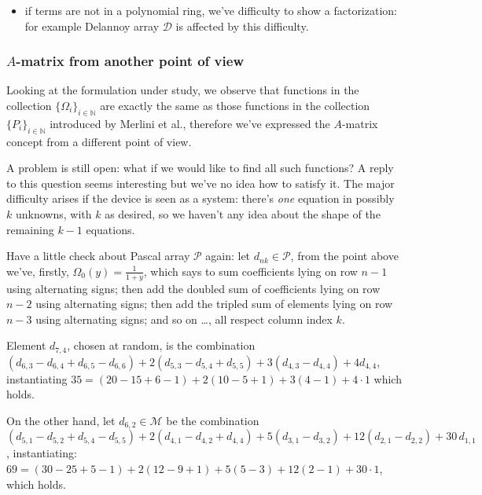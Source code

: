 \begin{itemize}
        \item if terms are not in a polynomial ring, we've difficulty to show a
        factorization: for example Delannoy array $\mathcal{D}$ is affected by this difficulty.

    \end{itemize}

\subsubsection{$A$-matrix from another point of view}

Looking at the formulation under study, we observe that functions
in the collection $\lbrace\Omega_{i}\rbrace_{i\in\mathbb{N}}$ 
are exactly the same as those functions in the collection 
$\lbrace P_{i}\rbrace_{i\in\mathbb{N}}$ 
introduced by Merlini et al., therefore we've expressed
the $A$-matrix concept from a different point of view. 

A problem is still open: what if we would like to find all such functions? A reply
to this question seems interesting but we've no idea how to satisfy it.
The major difficulty arises if the device is seen as a system:
there's \emph{one} equation in possibly $k$ unknowns, with $k$ as desired, 
so we haven't any idea about the shape of the remaining $k-1$ equations.

Have a little check about Pascal array $\mathcal{P}$ again:
let $d_{nk}\in\mathcal{P}$, from the point above we've, firstly,
$\Omega_{0}(y)=\frac{1}{1+y}$, which says to sum coefficients
lying on row $n-1$ using alternating signs; then add the doubled sum of
coefficients lying on row $n-2$ using alternating signs; 
then add the tripled sum of elements lying on row $n-3$ 
using alternating signs; and so on \ldots, all respect column index $k$. 

Element $d_{7,4}$, chosen at random, is the combination 
    $(d_{6,3}-d_{6,4}+d_{6,5}-d_{6,6})+
    2(d_{5,3}-d_{5,4}+d_{5,5}) + 3(d_{4,3}-d_{4,4}) + 4d_{4,4}$, 
    instantiating $35 = (20-15+6-1)+2(10-5+1)+3(4-1)+4\cdot1$
     which holds.

On the other hand, let $d_{6,2}\in\mathcal{M}$ be the
combination $(d_{5,1}-d_{5,2}+d_{5,4}-d_{5,5})
    +2(d_{4,1}-d_{4,2}+d_{4,4})
    +5(d_{3,1}-d_{3,2})
    +12(d_{2,1} -d_{2,2})
    +30\,d_{1,1}$, instantiating: 
    $69=(30-25+5-1)
    +2(12-9+1)
    +5(5-3)
    +12(2 -1)
    +30\cdot1$, which holds.

